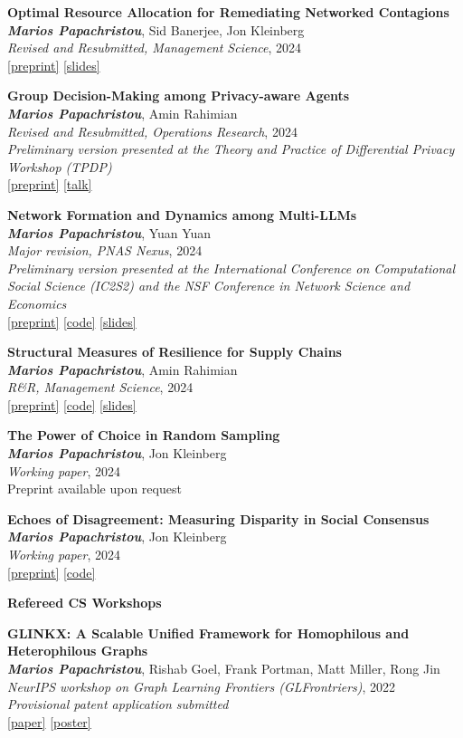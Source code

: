 \documentclass[margin]{res}
\newcommand{\field}[2]{\noindent \textbf{#1} \hfill #2 \\}
\newcommand{\specialurl}[2]{\href {#2} {{{[#1]}}}}
\newcommand{\preprint}[1]{\specialurl {preprint} {#1}}
\newcommand{\code}[1]{\specialurl {code} {#1}}
\newcommand{\talk}[1]{\specialurl {talk} {#1}}
\newcommand{\slides}[1]{\specialurl {slides} {#1}}
\newcommand{\poster}[1]{\specialurl {poster} {#1}}
\newcommand{\paper}[1]{\specialurl {paper} {#1}}
\newcommand{\authorref}[1]{{\textit{\textbf{#1}}}}
\newcommand{\authorme}{\authorref{Marios Papachristou}}
\newcommand{\publication}[5]{\textbf{#1}\\{#2}\\\emph{#3}, {#4}\\{#5}\smallskip}
\begin{document}
\begin{resume}
{\begin{enumerate}[nosep, label={[WP\arabic*]}]
   \item \publication{Optimal Resource Allocation for Remediating Networked Contagions}{\authorme, Sid Banerjee, Jon Kleinberg}{Revised and Resubmitted, Management Science}{2024}{\preprint{https://papers.ssrn.com/sol3/papers.cfm?abstract_id=4880536} \slides{https://drive.google.com/file/d/1DgOCnJ5Pf3Je-F7a-Adiy2TTZ7oZUbbB/view?usp=sharing}} 
      \item \publication{Group Decision-Making among Privacy-aware Agents}{\authorme, Amin Rahimian}{Revised and Resubmitted, Operations Research}{2024}{
  		\emph{Preliminary version presented at the Theory and Practice of Differential Privacy Workshop (TPDP)} \\ \preprint{https://arxiv.org/pdf/2402.08156.pdf} \talk{https://www.youtube.com/watch?v=Kmm5HEMuS4w}}
  		
   \item \publication{Network Formation and Dynamics among Multi-LLMs}{\authorme, Yuan Yuan}{Major revision, PNAS Nexus}{2024}{\emph{Preliminary version presented at the International Conference on Computational Social Science (IC2S2) and the NSF Conference in Network Science and Economics} \\ \preprint{http://arxiv.org/abs/2402.10659} \code{https://github.com/papachristoumarios/llm-network-formation} \slides{https://drive.google.com/file/d/13Qm_82D0WrkmN1LAv2AUmjcputMOdm_y/view?usp=drive_link}} 
      
   	   
   \item \publication{Structural Measures of Resilience for Supply Chains}{\authorme, Amin Rahimian}{R\&R, Management Science}{2024}{ 
   		\preprint{https://papers.ssrn.com/sol3/papers.cfm?abstract_id=4392226} \code{https://github.com/papachristoumarios/supply-chain-resilience} \slides{https://drive.google.com/file/d/13kgKnjTHyO8j4BOJVykWwt43hSt3JrLw/view?usp=drive_link}}
   		
   	\item \publication{The Power of Choice in Random Sampling}{\authorme, Jon Kleinberg}{Working paper}{2024}{Preprint available upon request}
   
   	\item \publication{Echoes of Disagreement: Measuring Disparity in Social Consensus}{\authorme, Jon Kleinberg}{Working paper}{2024}{\preprint{https://arxiv.org/abs/2504.07480} \code{https://github.com/papachristoumarios/disparity-optimization}}
    \end{enumerate}}


\field{Refereed CS Workshops}{}{
\begin{enumerate}[nosep, label={[W\arabic*]}]  
	\item \publication{GLINKX: A Scalable Unified Framework for Homophilous and Heterophilous Graphs}{\authorme, Rishab Goel, Frank Portman, Matt Miller, Rong Jin}{NeurIPS workshop on Graph Learning Frontiers (GLFrontriers)}{2022}{\emph{Provisional patent application submitted} \\ \paper{https://openreview.net/forum?id=GlViaJSwnlK} \poster{https://drive.google.com/file/d/14LwkvoH7sUe6qGvINGqTuMSHid16J3Av/view?usp=share_link}}
\end{enumerate}}


\end{resume}
\end{document}
